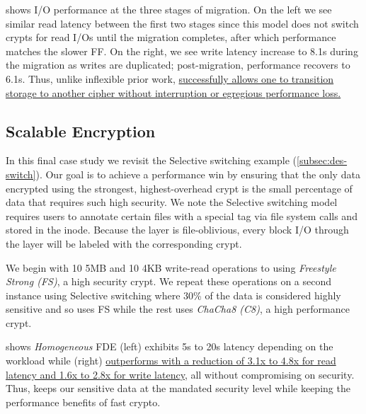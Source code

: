 

 shows I/O performance at the three stages of
migration. On the left we see similar read latency between the first two stages
since this model does not switch crypts for read I/Os until the migration
completes, after which performance matches the slower FF. On the right, we see
write latency increase to 8.1s during the migration as writes are duplicated;
post-migration, performance recovers to 6.1s.
Thus, unlike inflexible prior work, \sys \uline{successfully allows one to
transition storage to another cipher without interruption or egregious
performance loss.}


\subsection{Scalable Encryption}\label{subsec:usecase-scalable}

In this final case study we revisit the Selective switching example
(\cref{subsec:des-switch}). Our goal is to achieve a performance win by ensuring
that the only data encrypted using the strongest, highest-overhead crypt is the
small percentage of data that requires such high security. We note the Selective switching model
requires users to annotate certain files with a special tag via file system
calls and stored in the inode. Because the \sys layer is file-oblivious, every
block I/O through the \sys layer will be labeled with the corresponding crypt.

We begin with 10 5MB and 10 4KB write-read operations to \sys using {\em
Freestyle Strong (FS)}, a high security crypt. We repeat these operations on a
second instance using Selective switching where 30\% of the data is considered
highly sensitive and so uses FS while the rest uses {\em ChaCha8 (C8)}, a high
performance crypt.



 shows {\em Homogeneous} FDE (left) exhibits 5s to
20s latency depending on the workload while \sys (right) \uline{outperforms with
a reduction of 3.1x to 4.8x for read latency and 1.6x to 2.8x for write
latency}, all without compromising on security. Thus, \sys keeps our sensitive
data at the mandated security level while keeping the performance benefits of
fast crypto.
